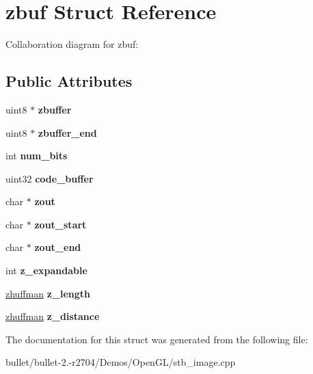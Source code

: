 \hypertarget{structzbuf}{\section{zbuf Struct Reference}
\label{structzbuf}
}


Collaboration diagram for zbuf\+:
\subsection*{Public Attributes}
\begin{DoxyCompactItemize}
\item 
\hypertarget{structzbuf_a7080eb91dcc67e1dfe818d08e6f22c4e}{uint8 $\ast$ {\bfseries zbuffer}}\label{structzbuf_a7080eb91dcc67e1dfe818d08e6f22c4e}

\item 
\hypertarget{structzbuf_af030baa17bebedd18272678da17a33f4}{uint8 $\ast$ {\bfseries zbuffer\+\_\+end}}\label{structzbuf_af030baa17bebedd18272678da17a33f4}

\item 
\hypertarget{structzbuf_acd069cdb4100884a732ad2794edbbdff}{int {\bfseries num\+\_\+bits}}\label{structzbuf_acd069cdb4100884a732ad2794edbbdff}

\item 
\hypertarget{structzbuf_a3bb8244d7be17801079c5a8587182edb}{uint32 {\bfseries code\+\_\+buffer}}\label{structzbuf_a3bb8244d7be17801079c5a8587182edb}

\item 
\hypertarget{structzbuf_aaf137c25fa5b9fb14e92354da4203c38}{char $\ast$ {\bfseries zout}}\label{structzbuf_aaf137c25fa5b9fb14e92354da4203c38}

\item 
\hypertarget{structzbuf_af31571e8d74c78c9bb18d92205150b28}{char $\ast$ {\bfseries zout\+\_\+start}}\label{structzbuf_af31571e8d74c78c9bb18d92205150b28}

\item 
\hypertarget{structzbuf_af07c0b7b7227f670ee1413bc0dcab791}{char $\ast$ {\bfseries zout\+\_\+end}}\label{structzbuf_af07c0b7b7227f670ee1413bc0dcab791}

\item 
\hypertarget{structzbuf_ae662f24e0973ca19b543e64647a6bfb6}{int {\bfseries z\+\_\+expandable}}\label{structzbuf_ae662f24e0973ca19b543e64647a6bfb6}

\item 
\hypertarget{structzbuf_a5906bdbe9dfb565339acac51af9efe89}{\hyperlink{structzhuffman}{zhuffman} {\bfseries z\+\_\+length}}\label{structzbuf_a5906bdbe9dfb565339acac51af9efe89}

\item 
\hypertarget{structzbuf_ae7d9588b2548708e14f3c6ad89bf26b5}{\hyperlink{structzhuffman}{zhuffman} {\bfseries z\+\_\+distance}}\label{structzbuf_ae7d9588b2548708e14f3c6ad89bf26b5}

\end{DoxyCompactItemize}


The documentation for this struct was generated from the following file\+:\begin{DoxyCompactItemize}
\item 
bullet/bullet-\/2.-\/r2704/\+Demos/\+Open\+G\+L/stb\+\_\+image.\+cpp\end{DoxyCompactItemize}

